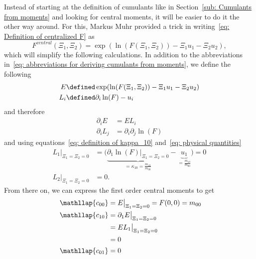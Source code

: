 Instead of starting at the definition of cumulants like in Section~\ref{sub: Cumulants from moments} and looking for central moments, it will be easier to do it the other way around.
For this, Markus Muhr provided a trick in writing~\eqref{eq: Definition of centralized F} as
\begin{equation}
  F^{central}(\Xi_1, \Xi_2) = \exp(\ln(F(\Xi_1,\Xi_2)) - \Xi_1 u_1 - \Xi_2 u_2),
\end{equation}
which will simplify the following calculations.
In addition to the abbreviations in~\eqref{eq: abbreviations for deriving cumulants from moments}, we define the following
\begin{equation}
  \label{eq: additional abbreviations}
  \begin{aligned}
    E & \defined \exp(\ln(F(\Xi_1,\Xi_2)) - \Xi_1 u_1 - \Xi_2 u_2) \\
    L_i & \defined \partial_i \ln(F) - u_i
  \end{aligned}
\end{equation}
and therefore
\begin{equation}
  \begin{aligned}
    \partial_i E & = EL_i \\
    \partial_i L_j & = \partial_i\partial_j\ln(F)
  \end{aligned}
\end{equation}
and using equations~\eqref{eq: definition of kappa_10} and~\eqref{eq: physical quantities}
\begin{equation}
  \begin{aligned}
    L_1\bigr|_{\Xi_1=\Xi_2 = 0} & = \bigg(
      \underbrace{ \partial_1\ln(F) \bigr|_{\Xi_1=\Xi_2 = 0}}_{ = \kappa_{10} = \frac{m_{10}}{m_{00}}}
      - \underbrace{u_1}_{ = \frac{m_{10}}{m_{00}}} \bigg) = 0 \\
    L_2\bigr|_{\Xi_1=\Xi_2 = 0} & = 0.
  \end{aligned}
\end{equation}
From there on, we can express the first order central moments to get
\begin{align*}
  \phantom{c_{00}}
  &\begin{aligned}
  \nonumber
    \mathllap{c_{00}} & = E\bigr|_{\Xi_1=\Xi_2 = 0} = F(0,0) = m_{00}
  \end{aligned}\\
  &\begin{aligned}
  \nonumber
    \mathllap{c_{10}} & =  \partial_1 E  \bigr|_{\Xi_1=\Xi_2 = 0} \\
    & = EL_1  \bigr|_{\Xi_1=\Xi_2 = 0} \\
    & = 0
  \end{aligned}\\
  &\begin{aligned}
  \nonumber
    \mathllap{c_{01}} & = 0
  \end{aligned}\\
\end{align*}
